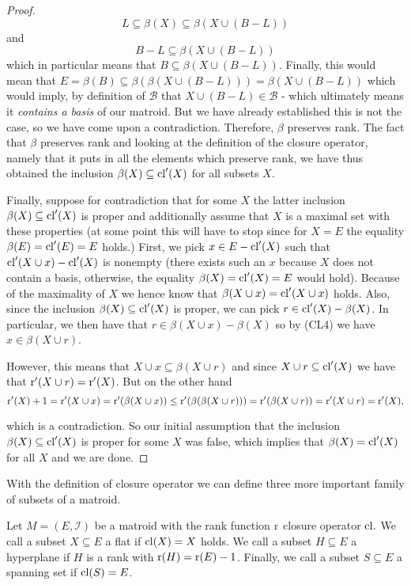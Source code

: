 \begin{proof}
$$L \subseteq \beta(X) \subseteq \beta(X \cup (B-L))$$ and $$B-L \subseteq \beta(X \cup (B-L))$$ which in particular means that $B \subseteq \beta(X \cup (B-L))$. Finally, this would mean that  
$E = \beta(B)\subseteq \beta(\beta(X \cup (B-L))) = \beta(X \cup (B-L))$ which would imply, by definition of $\mathcal{B}$ that $X \cup (B-L)
\in \mathcal{B}$ - which ultimately means it \textit{contains a basis} of our matroid. But we have already established this is not the case, so we have come upon a contradiction. Therefore, $\beta$ preserves rank.
The fact that $\beta$ preserves rank and looking at the definition of the closure operator, namely that it puts in all the elements which preserve rank, we have thus obtained the inclusion $\beta(X) \subseteq \mathrm{cl}'(X)$ for all subsets $X.$

Finally, suppose for contradiction that for some $X$ the latter inclusion $\beta(X) \subseteq \mathrm{cl}'(X)$ is proper and additionally assume that $X$ is a maximal set with these properties (at some point this will have to stop since for $X =E$ the equality $\beta(E) = \mathrm{cl}'(E) = E$ holds.) First, we pick $x \in E - \mathrm{cl}'(X)$ such that $\mathrm{cl}'(X\cup x) - \mathrm{cl}'(X)$ is nonempty (there exists such an $x$ because $X$ does not contain a basis, otherwise, the equality $\beta(X) = \mathrm{cl}'(X) = E$ would hold).
Because of the maximality of $X$ we hence know that $\beta(X\cup x) = \mathrm{cl}'(X \cup x)$ holds. Also, since the inclusion $\beta(X) \subseteq \mathrm{cl}'(X)$ is proper, we can pick $r \in \mathrm{cl}'(X) - \beta(X)$. In particular, we then have that $r \in \beta(X\cup x) - \beta(X)$ so by (CL4) we have $x \in \beta(X\cup r)$.

However, this means that $X \cup x \subseteq \beta(X\cup r)$ and since $X\cup r \subseteq \mathrm{cl}'(X)$ we have that $\operatorname{r}'(X\cup r) = 
\operatorname{r}'(X)$. But on the other hand $$\operatorname{r}'(X) + 1= \operatorname{r}'(X\cup x) = \operatorname{r}'(\beta(X\cup x))\leq \operatorname{r}'(\beta(\beta(X\cup r))) = \operatorname{r}'(\beta(X\cup r)) = \operatorname{r}'(X\cup r) = \operatorname{r}'(X),$$

which is a contradiction. So our initial assumption that the inclusion $\beta(X) \subseteq \mathrm{cl}'(X)$ is proper for some $X$ was false, which implies that $\beta(X) = \mathrm{cl}'(X)$ for all $X$ and we are done.

\end{proof}


With the definition of closure operator we can define three more important family of subsets of a matroid.

\begin{defn}\label{HP&SS}
    Let $M = (E, \mathcal{I})$ be a matroid with the rank function $\operatorname{r}$ closure operator $\mathrm{cl}.$ We call a subset $X \subseteq E$ a flat if $\mathrm{cl}(X) = X$ holds. We call a subset $H \subseteq E$ a hyperplane if $H$ is a rank with $\operatorname{r}(H) = \operatorname{r}(E)-1$. Finally, we call a subset $S \subseteq E$ a spanning set if $\mathrm{cl}(S) = E$.
\end{defn}

